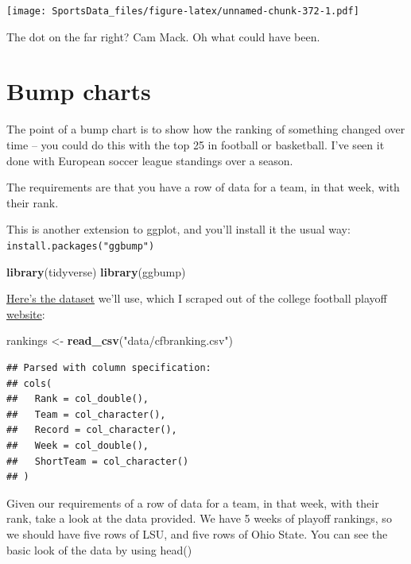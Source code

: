 \documentclass[
]{book}
\newenvironment{Shaded}{\begin{snugshade}}{\end{snugshade}}
\newcommand{\KeywordTok}[1]{\textcolor[rgb]{0.13,0.29,0.53}{\textbf{#1}}}
\newcommand{\NormalTok}[1]{#1}
\newcommand{\StringTok}[1]{\textcolor[rgb]{0.31,0.60,0.02}{#1}}
\begin{document}
\texttt{[image: SportsData\_files/figure-latex/unnamed-chunk-372-1.pdf]}

The dot on the far right? Cam Mack. Oh what could have been.

\hypertarget{bump-charts}{%
\chapter{Bump charts}\label{bump-charts}}

The point of a bump chart is to show how the ranking of something changed over time -- you could do this with the top 25 in football or basketball. I've seen it done with European soccer league standings over a season.

The requirements are that you have a row of data for a team, in that week, with their rank.

This is another extension to ggplot, and you'll install it the usual way: \texttt{install.packages("ggbump")}

\begin{Shaded}
\begin{Highlighting}[]
\KeywordTok{library}\NormalTok{(tidyverse)}
\KeywordTok{library}\NormalTok{(ggbump)}
\end{Highlighting}
\end{Shaded}

\href{https://unl.box.com/s/zgb8hv2fdzz36lcs5bcje59ri84dqjai}{Here's the dataset} we'll use, which I scraped out of the college football playoff \href{https://collegefootballplayoff.com/rankings.aspx}{website}:

\begin{Shaded}
\begin{Highlighting}[]
\NormalTok{rankings <-}\StringTok{ }\KeywordTok{read_csv}\NormalTok{(}\StringTok{"data/cfbranking.csv"}\NormalTok{)}
\end{Highlighting}
\end{Shaded}

\begin{verbatim}
## Parsed with column specification:
## cols(
##   Rank = col_double(),
##   Team = col_character(),
##   Record = col_character(),
##   Week = col_double(),
##   ShortTeam = col_character()
## )
\end{verbatim}

Given our requirements of a row of data for a team, in that week, with their rank, take a look at the data provided. We have 5 weeks of playoff rankings, so we should have five rows of LSU, and five rows of Ohio State. You can see the basic look of the data by using head()
\end{document}
